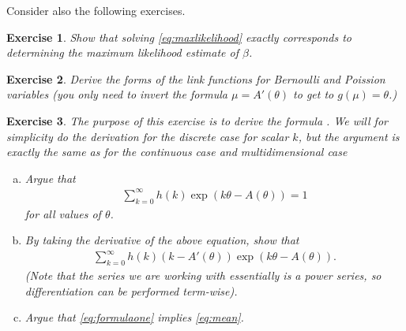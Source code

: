 \documentclass{article}
\newtheorem{exercise}{Exercise}
\begin{document}
 Consider also the following exercises.

\begin{exercise}
    Show that solving \eqref{eq:maxlikelihood} exactly corresponds to determining the maximum likelihood estimate of $\beta$.
\end{exercise}

\begin{exercise}
    Derive the forms of the link functions for Bernoulli and Poission variables (you only need to invert the formula  $\mu = A'(\theta)$ to get to $g(\mu)=\theta$.)
\end{exercise}

\begin{exercise}
    The purpose of this exercise is to derive the formula \label{eq:mean}. We will for simplicity do the derivation for the discrete case for scalar $k$, but the argument is exactly the same as for the continuous case and multidimensional case

    \begin{enumerate}[(a)]
        \item Argue that
        \begin{align*}
            \sum_{k=0}^\infty h(k) \exp(k\theta-A(\theta)) =1
        \end{align*}
        for all values of $\theta$.
        \item By taking the derivative of the above equation, show that
        \begin{align} \label{eq:formulaone}
            \sum_{k=0}^\infty h(k)(k-A'(\theta))\exp(k\theta-A(\theta)).
        \end{align}
       (Note that the series we are working with essentially is a power series, so differentiation can be performed term-wise).
        \item Argue that \eqref{eq:formulaone} implies \eqref{eq:mean}.
    \end{enumerate}
\end{exercise}
\end{document}
